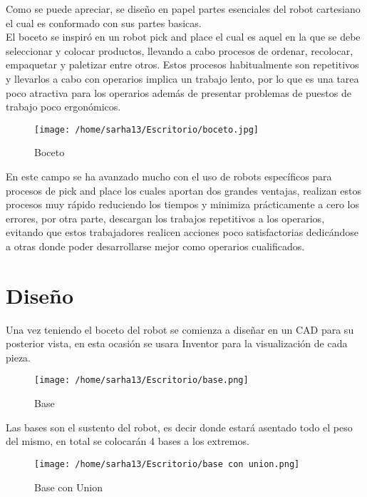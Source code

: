 \documentclass[12pt,a4paper]{report}
\begin{document}
Como se puede apreciar, se diseño en papel partes esenciales del robot cartesiano el cual es conformado con sus partes basicas.\\

El boceto se inspiró en un robot pick and place el cual es aquel en la que se debe seleccionar y colocar productos, llevando a cabo procesos de ordenar, recolocar, empaquetar y paletizar entre otros.
Estos procesos habitualmente son repetitivos y llevarlos a cabo con operarios implica un trabajo lento, por lo que es una tarea poco atractiva para los operarios además de presentar problemas de puestos de trabajo poco ergonómicos. \\

\begin{figure}[htp]
\centering
\texttt{[image: /home/sarha13/Escritorio/boceto.jpg]}
\caption{Boceto}
\label{Figura 1.}
\end{figure}

En este campo se ha avanzado mucho con el uso de robots específicos para procesos de pick and place los cuales aportan dos grandes ventajas, realizan estos procesos muy rápido reduciendo los tiempos y minimiza prácticamente a cero los errores, por otra parte, descargan los trabajos repetitivos a los operarios, evitando que estos trabajadores realicen acciones poco satisfactorias dedicándose a otras donde poder desarrollarse mejor como operarios cualificados.

\section{Diseño}
Una vez teniendo el boceto del robot se comienza a diseñar en un CAD para su posterior vista, en esta ocasión se usara Inventor  para la visualización de cada pieza.\\

\begin{figure}[htp]
\centering
\texttt{[image: /home/sarha13/Escritorio/base.png]}
\caption{Base}
\label{Figura 2.}
\end{figure}

Las bases son el sustento del robot, es decir donde estará asentado todo el peso del mismo, en total se colocarán 4 bases a los extremos. \\

\begin{figure}[htp]
\centering
\texttt{[image: /home/sarha13/Escritorio/base con union.png]}
\caption{Base con Union}
\label{Figura 3.}
\end{figure}
\end{document}
